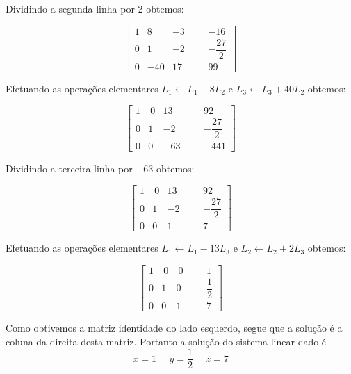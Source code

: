 \begin{solution}
Dividindo a segunda linha por 2 obtemos:

$$ \left[\begin{array}{rrrr|rr}
	1 &    8 &   -3 & & &  -16             \\[12pt]
	0 &    1 &   -2 & & &  -\dfrac{27}{2}  \\[12pt] 
	0 &  -40 &   17 & & &   99             \end{array}\right] $$

Efetuando as operações elementares $L_1 \leftarrow L_1 - 8L_2$ e $L_3 \leftarrow L_3 + 40L_2$ obtemos:

$$ \left[\begin{array}{rrrr|rr}
	1 & \  0 &   13 & & &  92               \\[12pt]
	0 &    1 &   -2 & & &  -\dfrac{27}{2}   \\[12pt] 
	0 &    0 &  -63 & & &  -441             \end{array}\right] $$

Dividindo a terceira linha por $-63$ obtemos:

$$ \left[\begin{array}{rrrr|rr}
	1 & \  0 &   13 & & &  92               \\[12pt]
	0 &    1 &   -2 & & &  -\dfrac{27}{2}   \\[12pt] 
	0 &    0 &    1 & & &  7                \end{array}\right] $$

Efetuando as operações elementares $L_1 \leftarrow L_1 - 13L_3$ e $L_2 \leftarrow L_2 + 2L_3$ obtemos:

$$ \left[\begin{array}{rrrr|rc}
	1 & \  0 & \  0 & & &  1               \\[12pt]
	0 &    1 &    0 & & &  \dfrac{1}{2}    \\[12pt] 
	0 &    0 &    1 & & &  7                \end{array}\right] $$

Como obtivemos a matriz identidade do lado esquerdo, segue que a solução é a coluna da direita desta matriz. 
Portanto a solução do sistema linear dado é
$$x=1 \ \ \ \ \ \ y = \dfrac{1}{2} \ \ \ \ \ \ z=7$$
\end{solution}

